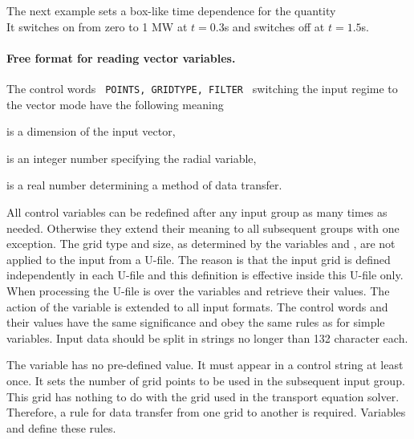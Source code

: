 The next example sets a box-like time dependence for the quantity
\smallskip\\
\vspace*{1ex}
It switches on from zero to 1 MW at $t=0.3$s and switches off at
$t=1.5$s. 

\paragraph{Free format for reading vector variables.}

The control words {\tt~POINTS, GRIDTYPE, FILTER~} switching the input
regime to the vector mode have the following meaning
\begin{description}
\vspace*{-1ex}
\item[--] is a dimension of the input vector,
\vspace*{-1ex}
\item[--] is an integer number specifying the radial
variable, 
\vspace*{-1ex}\item[--]
 is a real number determining a method of data transfer.
\end{description}
All control variables can be redefined after any input group as many
times as needed. 
Otherwise they extend their meaning to all subsequent groups with
one exception. 
The grid type and size, as determined by the variables 
and , are not applied to the input from a U-file. 
The reason is that the input grid is defined independently in each
U-file and this definition is effective inside this U-file only.
When processing the U-file is over the variables  and 
 retrieve their values.
The action of the variable  is extended to all input formats.
The control words  and their 
values have the same significance and obey the same rules as for simple 
variables.
Input data should be split in strings no longer than 132 character each.

The variable  has no pre-defined value. 
It must appear in a control string at least once.
It sets the number of grid points to be used in the subsequent
input group. 
This grid has nothing to do with the grid used in the transport equation
solver. 
Therefore, a rule for data transfer from one grid to another is required.
Variables  and  define these rules.

